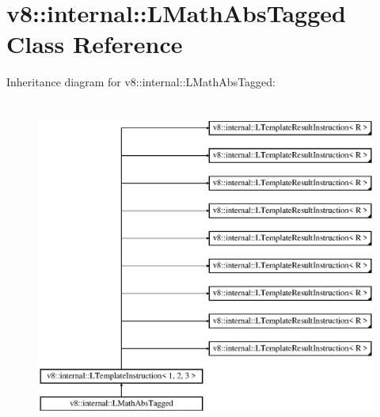 \hypertarget{classv8_1_1internal_1_1_l_math_abs_tagged}{}\section{v8\+:\+:internal\+:\+:L\+Math\+Abs\+Tagged Class Reference}
\label{classv8_1_1internal_1_1_l_math_abs_tagged}
Inheritance diagram for v8\+:\+:internal\+:\+:L\+Math\+Abs\+Tagged\+:\begin{figure}[H]
\begin{center}
\leavevmode
\includegraphics[height=11.000000cm]{classv8_1_1internal_1_1_l_math_abs_tagged}
\end{center}
\end{figure}
